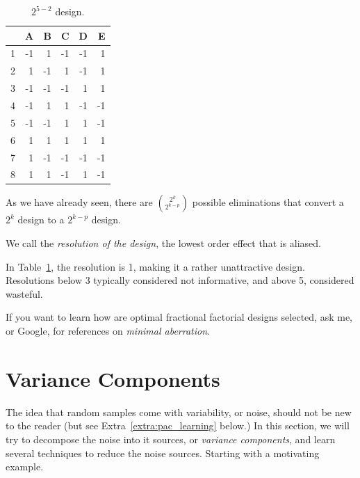 \begin{table}[ht]
\centering
\begin{tabular}{rrrrrr}
  \hline
 & A & B & C & D & E \\ 
  \hline
1 & -1 & 1 & -1 & -1 & 1 \\ 
  2 & 1 & -1 & 1 & -1 & 1 \\ 
  3 & -1 & -1 & -1 & 1 & 1 \\ 
  4 & -1 & 1 & 1 & -1 & -1 \\ 
  5 & -1 & -1 & 1 & 1 & -1 \\ 
  6 & 1 & 1 & 1 & 1 & 1 \\ 
  7 & 1 & -1 & -1 & -1 & -1 \\ 
  8 & 1 & 1 & -1 & 1 & -1 \\ 
   \hline
\end{tabular}
\label{tab:partial_factorial_ii}
\caption{$2^{5-2}$ design.}
\end{table}


As we have already seen, there are $\binom{2^k}{2^{k-p}}$ possible eliminations that convert a $2^k$ design to a $2^{k-p}$ design.
\begin{definition}
We call the \emph{resolution of the design}, the lowest order effect that is aliased. 
\end{definition}
In Table~\ref{tab:partial_factorial_ii}, the resolution is 1, making it a rather unattractive design. 
Resolutions below 3 typically considered not informative, and above 5, considered wasteful.


\begin{extra}
If you want to learn how are optimal fractional factorial designs selected, ask me, or Google, for references on \emph{minimal aberration}.
\end{extra}







\section{Variance Components}
The idea that random samples come with variability, or noise, should not be new to the reader (but see Extra~\ref{extra:pac_learning} below.)
In this section, we will try to decompose the noise into it sources, or \emph{variance components}, and learn several techniques to reduce the noise sources.
Starting with a motivating example.

